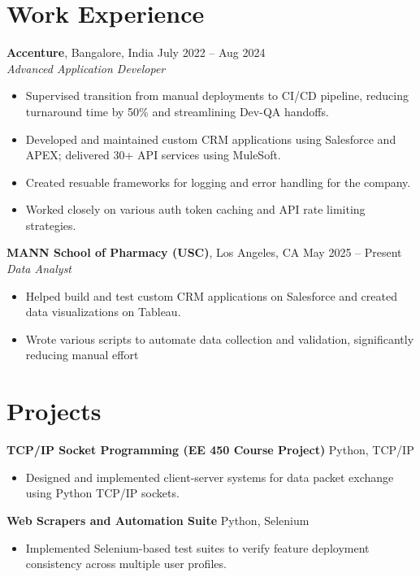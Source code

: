 \documentclass[letterpaper,10pt]{article}
\begin{document}
\section*{Work Experience}
\textbf{Accenture}, Bangalore, India \hfill July 2022 -- Aug 2024 \\
\textit{Advanced Application Developer}
\begin{itemize}[leftmargin=*,noitemsep]
    \item Supervised transition from manual deployments to CI/CD pipeline, reducing turnaround time by 50\% and streamlining Dev-QA handoffs.
    \item Developed and maintained custom CRM applications using Salesforce and APEX; delivered 30+ API services using MuleSoft.
    \item Created resuable frameworks for logging and error handling for the company.
    \item Worked closely on various auth token caching and API rate limiting strategies.
\end{itemize}

\vspace{4pt}

\textbf{MANN School of Pharmacy (USC)}, Los Angeles, CA \hfill May 2025 -- Present \\
\textit{Data Analyst}
\begin{itemize}[leftmargin=*,noitemsep]
    \item Helped build and test custom CRM applications on Salesforce and created data visualizations on Tableau.
    \item Wrote various scripts to automate data collection and validation, significantly reducing manual effort
\end{itemize}

\section*{Projects}
\textbf{TCP/IP Socket Programming (EE 450 Course Project)} \hfill Python, TCP/IP
\begin{itemize}[leftmargin=*,noitemsep]
    \item Designed and implemented client-server systems for data packet exchange using Python TCP/IP sockets.
\end{itemize}

\vspace{4pt}

\textbf{Web Scrapers and Automation Suite} \hfill Python, Selenium
\begin{itemize}[leftmargin=*,noitemsep]
    \item Implemented Selenium-based test suites to verify feature deployment consistency across multiple user profiles.
\end{itemize}
\end{document}
